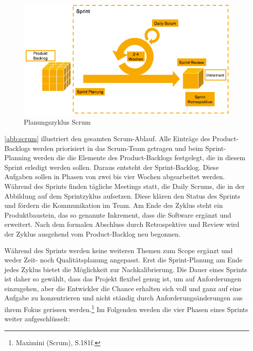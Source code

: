             \begin{figure}[!htbp]
                \begin{center}
                    \includegraphics[width=\textwidth]{Abbildungen/scrum}
                    \caption[Planungszyklus Scrum]{Planungszyklus Scrum}
                    \label{abb:scrum}
                \end{center}
            \end{figure}

            \autoref{abb:scrum} illustriert den gesamten Scrum-Ablauf. Alle Einträge des Product-Backlogs werden priorisiert in das Scrum-Team getragen und beim Sprint-Planning werden die die Elemente des Product-Backlogs festgelegt, die in diesem Sprint erledigt werden sollen. Daraus entsteht der Sprint-Backlog. Diese Aufgaben sollen in Phasen von zwei bis vier Wochen abgearbeitet werden. Während des Sprints finden tägliche Meetings statt, die Daily Scrums, die in der Abbildung auf dem Sprintzyklus aufsetzen. Diese klären den Status des Sprints und fördern die Kommunikation im Team. Am Ende des Zyklus steht ein Produktbaustein, das so genannte Inkrement, dass die Software ergänzt und erweitert. Nach dem formalen Abschluss durch Retrospektive und Review wird der Zyklus ausgehend vom Product-Backlog neu begonnen.

            Während des Sprints werden keine weiteren Themen zum Scope ergänzt und weder Zeit- noch Qualitätsplanung angepasst. Erst die Sprint-Planung am Ende jedes Zyklus bietet die Möglichkeit zur Nachkalibrierung. Die Dauer eines Sprints ist daher so gewählt, dass das Projekt flexibel genug ist, um auf Anforderungen einzugehen, aber die Entwickler die Chance erhalten sich voll und ganz auf eine Aufgabe zu konzentrieren und nicht ständig durch Anforderungsänderungen aus ihrem Fokus gerissen werden.\footnote{Maximini (Scrum), S.181f.} Im Folgenden werden die vier Phasen eines Sprints weiter aufgeschlüsselt:

